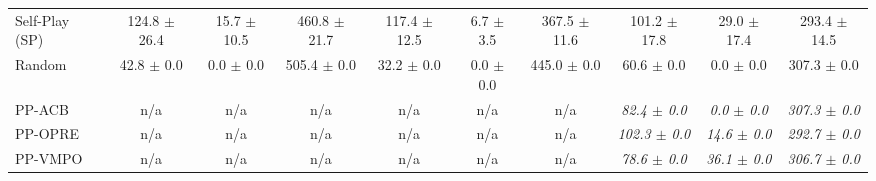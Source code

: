 \begin{table*}[t]
\begin{tabular}{l||ccc||ccc||ccc||}
        Self-Play (SP) & 124.8 {\footnotesize$\pm$ 26.4} & 15.7 {\footnotesize$\pm$ 10.5} & 460.8 {\footnotesize$\pm$ 21.7} & 117.4 {\footnotesize$\pm$ 12.5} & 6.7 {\footnotesize$\pm$ 3.5} & 367.5 {\footnotesize$\pm$ 11.6} & 101.2 {\footnotesize$\pm$ 
17.8} & 29.0 {\footnotesize$\pm$ 17.4} & 293.4 {\footnotesize$\pm$ 14.5} \\
        Random & 42.8 {\footnotesize$\pm$ 0.0} & 0.0 {\footnotesize$\pm$ 0.0} & 505.4 {\footnotesize$\pm$ 0.0} & 32.2 {\footnotesize$\pm$ 0.0} & 0.0 {\footnotesize$\pm$ 0.0} & 445.0 {\footnotesize$\pm$ 0.0} & 60.6 {\footnotesize$\pm$ 0.0} & 0.0 {\footnotesize$\pm$ 0.0} & 307.3 {\footnotesize$\pm$ 0.0} \\ 
        PP-ACB & n/a & n/a & n/a & n/a & n/a & n/a & \textit{82.4 {\footnotesize$\pm$ 0.0}} & \textit{0.0 {\footnotesize$\pm$ 0.0}} & \textit{307.3 {\footnotesize$\pm$ 0.0}} \\
        PP-OPRE & n/a & n/a & n/a & n/a & n/a & n/a & \textit{102.3 {\footnotesize$\pm$ 0.0}} & \textit{14.6 {\footnotesize$\pm$ 0.0}} & \textit{292.7 {\footnotesize$\pm$ 0.0}} \\
        PP-VMPO & n/a & n/a & n/a & n/a & n/a & n/a & \textit{78.6 {\footnotesize$\pm$ 0.0}} & \textit{36.1 {\footnotesize$\pm$ 0.0}} & \textit{306.7 {\footnotesize$\pm$ 0.0}} \\
    \end{tabular}
\end{table*}
